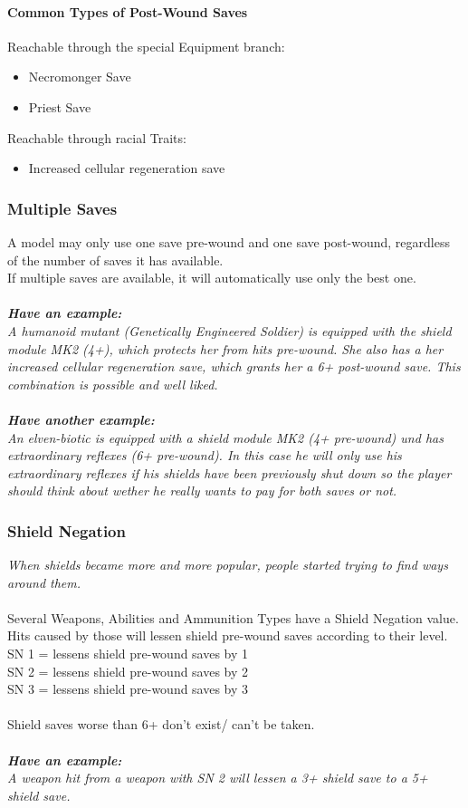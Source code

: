 \documentclass[
	11pt,
	toc=bibliography
	]{article}
\begin{document}
\paragraph{Common Types of Post-Wound Saves}
Reachable through the special Equipment branch:
\begin{itemize}
\item Necromonger Save
\item Priest Save
\end{itemize}
Reachable through racial Traits:
\begin{itemize}
\item Increased cellular regeneration save
\end{itemize}

\subsubsection{Multiple Saves}\label{multipleSaves}
A model may only use one save pre-wound and one save post-wound, regardless of the number of saves it has available.\\ If multiple saves are available, it will automatically use only the best one.\\\\
\textit{\textbf{Have an example:}\\
A humanoid mutant (Genetically Engineered Soldier) is equipped with the shield module MK2 (4+), which protects her from hits pre-wound. She also has a her increased cellular regeneration save, which grants her a 6+ post-wound save. This combination is possible and well liked. \\\\
\textbf{Have another example:}\\
An elven-biotic is equipped with a shield module MK2 (4+ pre-wound) und has extraordinary reflexes (6+ pre-wound).  In this case he will only use his extraordinary reflexes if his shields have been previously shut down so the player should think about wether he really wants to pay for both saves or not.}


\subsubsection{Shield Negation}\label{shieldNegation}
\textit{When shields became more and more popular, people started trying to find ways around them.}\\\\
Several Weapons, Abilities and Ammunition Types have a Shield Negation value.  Hits caused by those will lessen shield pre-wound saves according to their level.\\
SN 1 = lessens shield pre-wound saves by 1\\
SN 2 = lessens shield pre-wound saves by 2\\
SN 3 = lessens shield pre-wound saves by 3\\\\
Shield saves worse than 6+ don't exist/ can't be taken.\\\\
\textit{\textbf{Have an example:}\\
A weapon hit from a weapon with SN 2 will lessen a 3+ shield save to a 5+ shield save.
}
\end{document}

